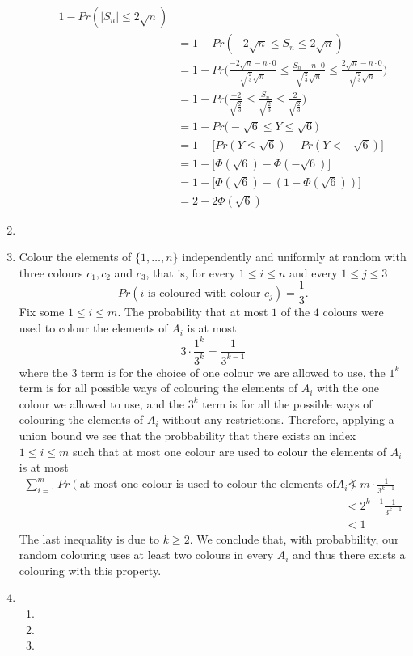 \documentclass[a4paper, 11pt, oneside]{article}
\newcommand\abs[1]{\left|#1\right|}
\begin{document}
\begin{enumerate}
\begin{enumerate}
\begin{align*}
 1 - Pr(\abs{S_n} \leq 2\sqrt{n}) \\&=
 1 - Pr(-2\sqrt{n} \leq S_n \leq 2\sqrt{n}) \\&=
 1 - Pr\Bigg(\frac{-2\sqrt{n} - n \cdot 0}{\sqrt{\frac{2}{3}}\sqrt{n}} \leq \frac{S_n - n \cdot 0}{\sqrt{\frac{2}{3}}\sqrt{n}} \leq \frac{2\sqrt{n} - n \cdot 0}{\sqrt{\frac{2}{3}}\sqrt{n}}\Bigg) \\&=
 1 - Pr\Bigg(\frac{-2}{\sqrt{\frac{2}{3}}} \leq \frac{S_n}{\sqrt{\frac{2}{3}}} \leq \frac{2}{\sqrt{\frac{2}{3}}}\Bigg)\\&=
 1 - Pr\Bigg(-\sqrt{6} \leq Y \leq \sqrt{6}\Bigg)\\&=
 1 - \Big[Pr(Y \leq \sqrt{6}) - Pr(Y < -\sqrt{6})\Big] \\&=
 1 - \Big[\Phi(\sqrt{6}) -\Phi(-\sqrt{6})\Big] \\&=
 1 - \Big[\Phi(\sqrt{6}) - (1 - \Phi(\sqrt{6}))\Big] \\&=
 2 - 2\Phi(\sqrt{6})
 \end{align*}
\end{enumerate}
\item

\item Colour the elements of $\{1,\ldots,n\}$ independently and uniformly at random with three colours $c_1,c_2$ and $c_3$, 
that is, for every $1 \leq i \leq n$ and every $1 \leq j \leq 3$
\begin{equation*}
Pr(i\text{ is coloured with colour }c_j) = \frac{1}{3}.
 \end{equation*}
Fix some $1 \leq i \leq m$. The probability that at most $1$ of the $4$ colours were used to colour the elements of $A_i$ is at most
\begin{equation*}
3 \cdot \frac{1^k}{3^k} = \frac{1}{3^{k-1}}
 \end{equation*}
 where the $3$ term is for the choice of one colour we are allowed to use, the $1^k$ term is for all possible ways of colouring the elements of $A_i$ with the one colour we allowed to use, and the $3^k$ term is for all the possible ways of colouring the elements of $A_i$ without any restrictions.
 Therefore, applying a union bound we see that the probbability that there exists an index $1 \leq i \leq m$ such that at most one colour are used to colour the elements of $A_i$ is at most
 \begin{align*}
\sum^m_{i=1}Pr(\text{at most one colour is used to colour the elements of} A_i) &\leq m \cdot\frac{1}{3^{k-1}} 
\\&< 2^{k-1} \frac{1}{3^{k-1}}  \\&< 1
 \end{align*}
The last inequality is due to $k \geq 2$. We conclude that, with probabbility, our random colouring uses at least two colours in every $A_i$ and thus there exists a colouring with this property.
\item
 \begin{enumerate}
\item  
\item  
\item  
 \end{enumerate}
\end{enumerate}

\begin{thebibliography}{9} 

\end{thebibliography}
\end{document}
